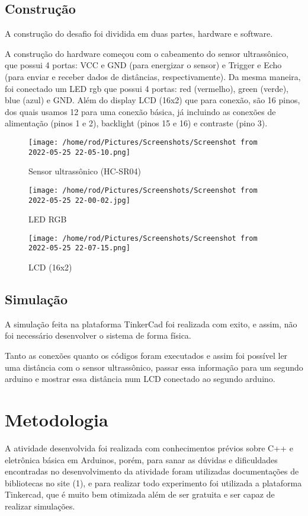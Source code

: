 \documentclass[conference]{IEEEtran}
\begin{document}
\subsection{Construção}
A construção do desafio foi dividida em duas partes, hardware e software. 

A construção do hardware começou com o cabeamento do sensor ultrassônico, que possui 4 portas: VCC e GND (para
energizar o sensor) e Trigger e Echo (para enviar e receber dados de distâncias, respectivamente). Da mesma maneira,
foi conectado um LED rgb que possui 4 portas: red (vermelho), green (verde), blue (azul) e GND. Além do display LCD (16x2)
que para conexão, são 16 pinos, dos quais usamos 12 para uma conexão básica, já incluindo as conexões de alimentação (pinos 1 e 2),
 backlight (pinos 15 e 16) e contraste (pino 3).

 \begin{figure}[htbp]
    \centerline{\texttt{[image: /home/rod/Pictures/Screenshots/Screenshot from 2022-05-25 22-05-10.png]}}
    \caption{Sensor ultrassônico (HC-SR04)}
    \label{fig}
    \end{figure}

    \begin{figure}[htbp]
        \centerline{\texttt{[image: /home/rod/Pictures/Screenshots/Screenshot from 2022-05-25 22-00-02.jpg]}}
        \caption{LED RGB}
        \label{fig}
        \end{figure}

        \begin{figure}[htbp]
            \centerline{\texttt{[image: /home/rod/Pictures/Screenshots/Screenshot from 2022-05-25 22-07-15.png]}}
            \caption{LCD (16x2)}
            \label{fig}
            \end{figure}

\subsection{Simulação}
 A simulação feita na plataforma TinkerCad foi realizada com exito, e assim, não foi necessário desenvolver o sistema de forma física.
 
 Tanto as conexões quanto os códigos foram executados e assim foi possível ler uma distância com o sensor ultrassônico, passar essa informação para um segundo arduino
 e mostrar essa distância num LCD conectado ao segundo arduino.

\section{Metodologia}
 A atividade desenvolvida foi realizada com conhecimentos prévios sobre C++ e eletrônica básica em Arduinos, porém, para sanar as dúvidas e dificuldades encontradas no
 desenvolvimento da atividade foram utilizadas documentações de bibliotecas no site (1), e para realizar todo experimento foi utilizada a plataforma Tinkercad, que é
 muito bem otimizada além de ser gratuita e ser capaz de realizar simulações.
\end{document}
